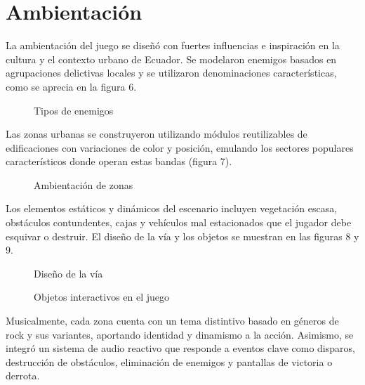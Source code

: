 \section{Ambientación}

La ambientación del juego se diseñó con fuertes influencias e inspiración en la cultura y el contexto urbano de Ecuador. Se modelaron enemigos basados en agrupaciones delictivas locales y se utilizaron denominaciones características, como se aprecia en la figura 6.

\begin{figure}[H]
    \centering
    \caption{Tipos de enemigos}
    \label{fig:tipos_enemigos}
\end{figure}

Las zonas urbanas se construyeron utilizando módulos reutilizables de edificaciones con variaciones de color y posición, emulando los sectores populares característicos donde operan estas bandas (figura 7).

\begin{figure}[H]
    \centering
    \caption{Ambientación de zonas}
    \label{fig:ambientacion_zonas}
\end{figure}

Los elementos estáticos y dinámicos del escenario incluyen vegetación escasa, obstáculos contundentes, cajas y vehículos mal estacionados que el jugador debe esquivar o destruir. El diseño de la vía y los objetos se muestran en las figuras 8 y 9.

\begin{figure}[H]
    \centering
    \caption{Diseño de la vía}
    \label{fig:ambientacion_calle}
\end{figure}

\begin{figure}[H]
    \centering
    \caption{Objetos interactivos en el juego}
    \label{fig:objetos_juego}
\end{figure}

Musicalmente, cada zona cuenta con un tema distintivo basado en géneros de rock y sus variantes, aportando identidad y dinamismo a la acción. Asimismo, se integró un sistema de audio reactivo que responde a eventos clave como disparos, destrucción de obstáculos, eliminación de enemigos y pantallas de victoria o derrota.
